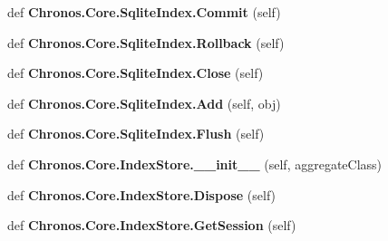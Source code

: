 \begin{DoxyCompactItemize}
\item 
def {\bfseries Chronos.\+Core.\+Sqlite\+Index.\+Commit} (self)\hypertarget{group__Chronos_gad174692ff8adc3b60aa40e158da7105e}{}\label{group__Chronos_gad174692ff8adc3b60aa40e158da7105e}

\item 
def {\bfseries Chronos.\+Core.\+Sqlite\+Index.\+Rollback} (self)\hypertarget{group__Chronos_gafdfb41fb8feae16ce510bf5c01375ad1}{}\label{group__Chronos_gafdfb41fb8feae16ce510bf5c01375ad1}

\item 
def {\bfseries Chronos.\+Core.\+Sqlite\+Index.\+Close} (self)\hypertarget{group__Chronos_gad3a5dd2c6c439958fd87562a2936de77}{}\label{group__Chronos_gad3a5dd2c6c439958fd87562a2936de77}

\item 
def {\bfseries Chronos.\+Core.\+Sqlite\+Index.\+Add} (self, obj)\hypertarget{group__Chronos_gac7aa85f0ec278d7d96d7cf7e99214154}{}\label{group__Chronos_gac7aa85f0ec278d7d96d7cf7e99214154}

\item 
def {\bfseries Chronos.\+Core.\+Sqlite\+Index.\+Flush} (self)\hypertarget{group__Chronos_gad079eb93b97b3a0de75765fcf597648b}{}\label{group__Chronos_gad079eb93b97b3a0de75765fcf597648b}

\item 
def {\bfseries Chronos.\+Core.\+Index\+Store.\+\_\+\+\_\+init\+\_\+\+\_\+} (self, aggregate\+Class)\hypertarget{group__Chronos_gad4b4a883f7bd0db3b1cf8e6696bcc4e8}{}\label{group__Chronos_gad4b4a883f7bd0db3b1cf8e6696bcc4e8}

\item 
def {\bfseries Chronos.\+Core.\+Index\+Store.\+Dispose} (self)\hypertarget{group__Chronos_ga9ce7cd4a80dd03c4096d995b87341ddc}{}\label{group__Chronos_ga9ce7cd4a80dd03c4096d995b87341ddc}

\item 
def {\bfseries Chronos.\+Core.\+Index\+Store.\+Get\+Session} (self)\hypertarget{group__Chronos_gaf712c2a0ebb64ebf0ec3d7ec07a42a19}{}\label{group__Chronos_gaf712c2a0ebb64ebf0ec3d7ec07a42a19}


\end{DoxyCompactItemize}
